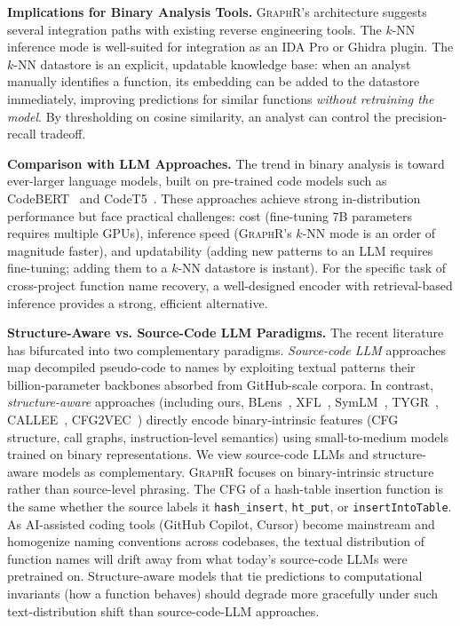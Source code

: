\documentclass[sigconf,nonacm]{acmart}
\newcommand{\sysname}{\textsc{GraphR}}
\begin{document}
\textbf{Implications for Binary Analysis Tools.}
\sysname{}'s architecture suggests several integration paths with existing reverse engineering tools. The $k$-NN inference mode is well-suited for integration as an IDA Pro or Ghidra plugin. The $k$-NN datastore is an explicit, updatable knowledge base: when an analyst manually identifies a function, its embedding can be added to the datastore immediately, improving predictions for similar functions \emph{without retraining the model}. By thresholding on cosine similarity, an analyst can control the precision-recall tradeoff.

\textbf{Comparison with LLM Approaches.}
The trend in binary analysis is toward ever-larger language models, built on pre-trained code models such as CodeBERT~\cite{codebert} and CodeT5~\cite{codet5}. These approaches achieve strong in-distribution performance but face practical challenges: cost (fine-tuning 7B parameters requires multiple GPUs), inference speed (\sysname{}'s $k$-NN mode is an order of magnitude faster), and updatability (adding new patterns to an LLM requires fine-tuning; adding them to a $k$-NN datastore is instant). For the specific task of cross-project function name recovery, a well-designed encoder with retrieval-based inference provides a strong, efficient alternative.

\textbf{Structure-Aware vs. Source-Code LLM Paradigms.}
\label{sec:paradigms}
The recent literature has bifurcated into two complementary paradigms. \emph{Source-code LLM} approaches~\cite{symgen,prorec,beyondclass} map decompiled pseudo-code to names by exploiting textual patterns their billion-parameter backbones absorbed from GitHub-scale corpora. In contrast, \emph{structure-aware} approaches (including ours, BLens~\cite{blens}, XFL~\cite{xfl}, SymLM~\cite{symlm}, TYGR~\cite{tygr}, CALLEE~\cite{callee}, CFG2VEC~\cite{cfg2vec}) directly encode binary-intrinsic features (CFG structure, call graphs, instruction-level semantics) using small-to-medium models trained on binary representations. We view source-code LLMs and structure-aware models as complementary. \sysname{} focuses on binary-intrinsic structure rather than source-level phrasing. The CFG of a hash-table insertion function is the same whether the source labels it \texttt{hash\_insert}, \texttt{ht\_put}, or \texttt{insertIntoTable}. As AI-assisted coding tools (GitHub Copilot, Cursor) become mainstream and homogenize naming conventions across codebases, the textual distribution of function names will drift away from what today's source-code LLMs were pretrained on. Structure-aware models that tie predictions to computational invariants (how a function behaves) should degrade more gracefully under such text-distribution shift than source-code-LLM approaches.
\end{document}
